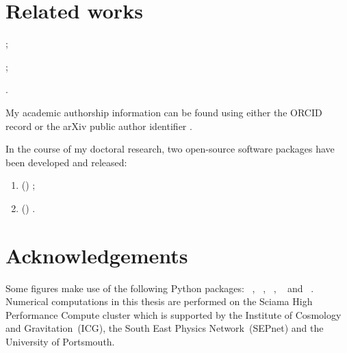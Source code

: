 %


\section*{Related works}

\begin{enumerate}[label={[\arabic*]}] \raggedright
    \item {};
    \item {};
    \item {}.
\end{enumerate}

My academic authorship information can be found using either the ORCID record  or the arXiv public author identifier \arxiv{}.

In the course of my doctoral research, two open-source software packages have been developed and released:
\begin{enumerate}
    \item \hypertarget{harmonia}{} () ;
    \item \hypertarget{horizonground}{} () .
\end{enumerate}

\section*{Acknowledgements}

Some figures make use of the following Python packages: ~\cite{NumPy2020}, ~\cite{SciPy2020}, ~\cite{astropy2013,astropy2018}, ~\cite{Hand2018} and ~\cite{Hunter2007}. Numerical computations in this thesis are performed on the Sciama High Performance Compute cluster which is supported by the Institute of Cosmology and Gravitation~(ICG), the South East Physics Network~(SEPnet) and the University of Portsmouth.
